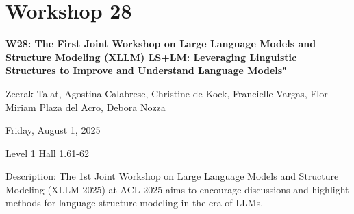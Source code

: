 \clearpage


\section[W28: The First Joint Workshop on Large Language Models and Structure Modeling (XLLM)
LS+LM: Leveraging Linguistic Structures to Improve and Understand Language Models"]{Workshop 28}

\begin{center}
    {\Large \textbf{W28: The First Joint Workshop on Large Language Models and Structure Modeling (XLLM)
LS+LM: Leveraging Linguistic Structures to Improve and Understand Language Models"}}

Zeerak Talat, Agostina Calabrese, Christine de Kock, Francielle Vargas, Flor Miriam Plaza del Acro, Debora Nozza

    Friday, August 1, 2025

Level 1 Hall 1.61-62

\end{center}

Description: The 1st Joint Workshop on Large Language Models and Structure Modeling (XLLM 2025) at ACL 2025 aims to encourage discussions and highlight methods for language structure modeling in the era of LLMs.  
